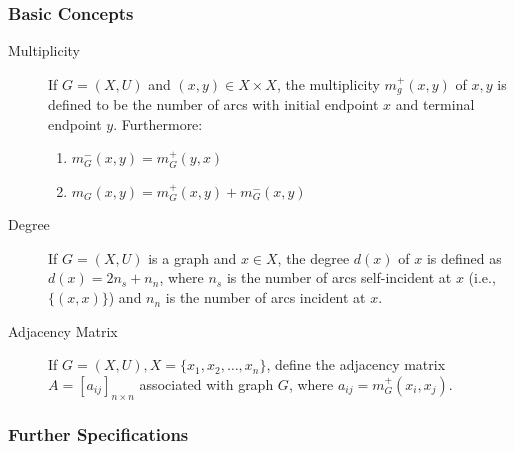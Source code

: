 \subsubsection{Basic Concepts \cite{berge1973}}
\begin{description}
	\item[Multiplicity] If $G=(X, U)$ and $(x, y) \in X\times X$, the multiplicity $m_g^+(x, y)$ of $x, y$ is defined to be the number of arcs with initial endpoint $x$ and terminal endpoint $y$. Furthermore:
	\begin{enumerate}
		\item $m_G^-(x, y) = m_G^+(y, x)$
		\item $m_G(x, y) = m_G^+(x, y) + m_G^-(x, y)$
	\end{enumerate}

	\item[Degree] If $G=(X, U)$ is a graph and $x\in X$, the degree $d(x)$ of $x$ is defined \cite{may1972} as
	$d(x) = 2n_s  + n_n$, where $n_s$ is the number of arcs self-incident at $x$ (i.e., $\{(x, x)\}$) and $n_n$ is the number of arcs incident at $x$.

	\item[Adjacency Matrix] If $G=(X, U), X=\{x_1, x_2, \dots, x_n \}$, define the adjacency matrix $A=[a_{ij}]_{n\times n}$ associated with graph $G$, where $a_{ij} = m_G^+(x_i, x_j)$.
\end{description}

\subsubsection{Further Specifications}

